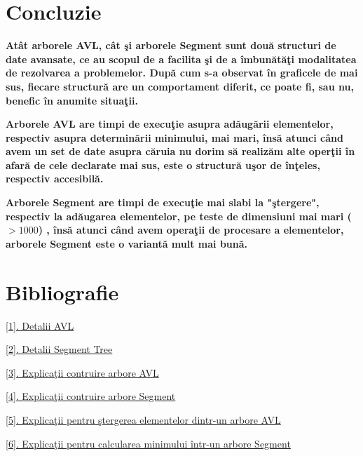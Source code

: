 \documentclass[12pt]{article}
\begin{document}
\newpage
\section{Concluzie}
\textbf{\hspace{7mm} At\^{a}t arborele AVL, c\^{a}t \c{s}i arborele Segment sunt dou\u{a} structuri de date avansate, ce au scopul de a facilita \c{s}i de a \^{i}mbun\u{a}t\u{a}\c{t}i modalitatea de rezolvarea a problemelor. Dup\u{a} cum s-a observat \^{i}n graficele de mai sus, fiecare structur\u{a} are un comportament diferit, ce poate fi, sau nu, benefic \^{i}n anumite situa\c{t}ii.}

\textbf{\hspace{2mm} Arborele AVL are timpi de execu\c{t}ie asupra ad\u{a}ug\u{a}rii elementelor, respectiv asupra determin\u{a}rii minimului, mai mari, \^{i}ns\u{a} atunci c\^{a}nd avem un set de date asupra c\u{a}ruia nu dorim s\u{a} realiz\u{a}m alte oper\c{t}ii \^{i}n afar\u{a} de cele declarate mai sus, este o structur\u{a} u\c{s}or de \^{i}n\c{t}eles, respectiv accesibil\u{a}.}

\textbf{\hspace{2mm} Arborele Segment are timpi de execu\c{t}ie mai slabi la "\c{s}tergere", respectiv la ad\u{a}ugarea elementelor, pe teste de dimensiuni mai mari ($ > 1000$) , \^{i}ns\u{a} atunci c\^{a}nd avem opera\c{t}ii de procesare a elementelor, arborele Segment este o variant\u{a} mult mai bun\u{a}.}
\newpage
\section{Bibliografie}
\hspace{5mm} \href{https://en.wikipedia.org/wiki/AVL_tree}{[1]. Detalii AVL}

\href{https://en.wikipedia.org/wiki/Segment_tree}{[2]. Detalii Segment Tree}

\href{http://www.geeksforgeeks.org/avl-tree-set-1-insertion/}{[3]. Explica\c{t}ii contruire arbore AVL}

\href{http://www.geeksforgeeks.org/segment-tree-set-1-sum-of-given-range/}{[4]. Explica\c{t}ii contruire arbore Segment}

\href{http://www.geeksforgeeks.org/avl-tree-set-2-deletion/}{[5]. Explica\c{t}ii pentru \c{s}tergerea elementelor dintr-un arbore AVL}

\href{http://www.geeksforgeeks.org/segment-tree-set-1-range-minimum-query/} {[6]. Explica\c{t}ii pentru calcularea minimului \^{i}ntr-un arbore Segment}
\end{document}
